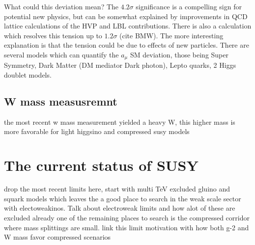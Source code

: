 What could this deviation mean?
The $4.2\sigma$ significance is a compelling sign for potential new physics, but can be somewhat explained by improvements in QCD lattice calculations of the HVP and LBL contributions. There is also a calculation which resolves this tension up to $1.2\sigma$ (cite BMW). The more interesting explanation is that the tension could be due to effects of new particles. There are several models which can quantify the $a_\mu$ SM deviation, those being Super Symmetry, Dark Matter (DM mediator Dark photon), Lepto quarks, 2 Higgs doublet models.



\subsection{W mass measusremnt}
the most recent w mass measurement yielded a heavy W, this higher mass is more favorable for light higgsino and compressed susy models

\section{The current status of SUSY}
drop the most recent limits here, start with multi TeV excluded gluino and squark models which leaves the a good place to search in the weak scale sector with electoweakinos. Talk about electroweak limits and how alot of these are excluded already one of the remaining places to search is the compressed corridor where mass splittings are small. link this limit motivation with how both g-2 and W mass favor compressed scenarios



